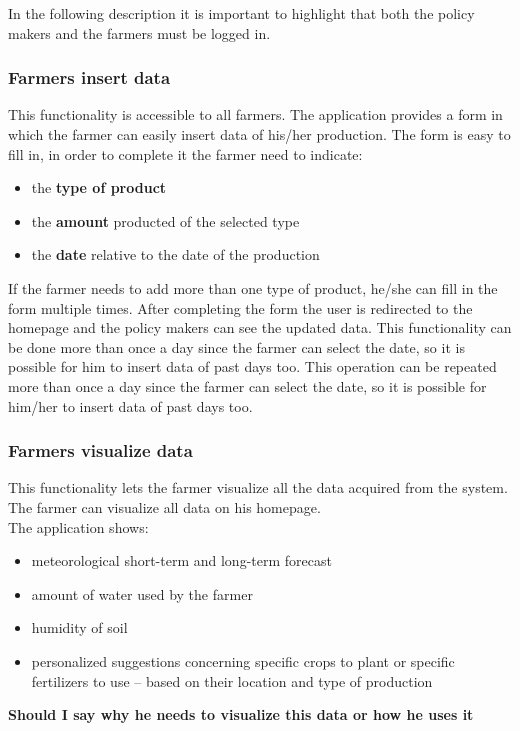 In the following description it is important to highlight that both
the policy makers and the farmers must be logged in.

\subsubsection{Farmers insert data} 
This functionality is accessible to all farmers. 
The application provides a form in which the farmer can easily insert data of his/her production.
The form is easy to fill in, in order to complete it the farmer need to indicate:
\begin{itemize}
    \item the \textbf{type of product}
    \item the \textbf{amount} producted of the selected type
    \item the \textbf{date} relative to the date of the production
\end{itemize}
If the farmer needs to add more than one type of product, 
he/she can fill in the form multiple times.
After completing the form the user is redirected to the homepage and the policy makers 
can see the updated data.
This functionality can be done more than once a day since the farmer can select the date, 
so it is possible for him to insert data of past days too.
This operation can be repeated more than once a day since the farmer can select the date, so it is possible for him/her to insert data of past days too.



\subsubsection{Farmers visualize data}
This functionality lets the farmer visualize all the data 
acquired from the system. The farmer can visualize all data on his homepage.\\
The application shows:
\begin{itemize}
    \item meteorological  short-term and long-term forecast
    \item amount of water used by the farmer
    \item humidity of soil 
    \item personalized suggestions concerning specific crops to plant or specific 
    fertilizers to use – based on their location and type of production
\end{itemize}

\textbf{Should I say why he needs to visualize this data or how he uses it}


